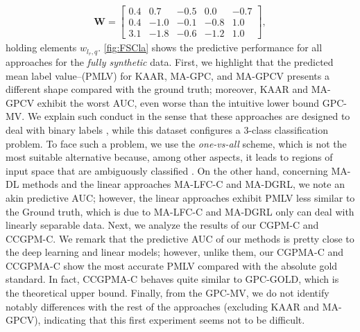 \documentclass[journal]{IEEEtran}
\newcommand{\boldW}{\mathbf{W}}
\begin{document}
\begin{align}
\boldW=\begin{bmatrix}
0.4  &  0.7   & -0.5 &  0.0  & -0.7\\
0.4   &  -1.0  & -0.1  &  -0.8 & 1.0\\
3.1   &  -1.8  & -0.6  &  -1.2   & 1.0
\end{bmatrix},
\label{eq:parametersPC}
\end{align}
holding elements $w_{l_r,q}$. \cref{fig:FSCla} shows the predictive performance for all approaches for the \textit{fully synthetic} data. First, we highlight that the predicted mean label value--(PMLV) for KAAR, MA-GPC, and MA-GPCV presents a different shape compared with the ground truth; moreover, KAAR and MA-GPCV exhibit the worst AUC, even worse than the intuitive lower bound GPC-MV. We explain such conduct in the sense that these approaches are designed to deal with binary labels \cite{gil2018learning,rodrigues2014gaussian,ruiz2019learning}, while this dataset configures a 3-class classification problem. To face such a problem, we use the \textit{one-vs-all} scheme, which is not the most suitable alternative because, among other aspects, it leads to regions of input space that are ambiguously classified \cite{bishop2006pattern}. On the other hand, concerning MA-DL methods and the linear approaches MA-LFC-C and MA-DGRL, we note an akin predictive AUC; however, the linear approaches exhibit PMLV less similar to the Ground truth, which is due to MA-LFC-C and MA-DGRL only can deal with linearly separable data. Next, we analyze the results of our CGPM-C and CCGPM-C. We remark that the predictive AUC of our methods is pretty close to the deep learning and linear models; however, unlike them, our CGPMA-C and CCGPMA-C show the most accurate PMLV compared with the absolute gold standard. In fact, CCGPMA-C behaves quite similar to GPC-GOLD, which is the theoretical upper bound. Finally, from the GPC-MV, we do not identify notably differences with the rest of the approaches (excluding KAAR and MA-GPCV), indicating that this first experiment seems not to be difficult.\\
\end{document}
